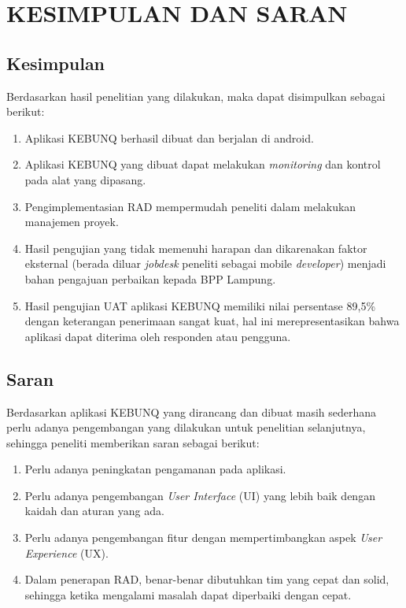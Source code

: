 \chapter{KESIMPULAN DAN SARAN}

%
\vspace{4.5pt}

\begin{flushleft}
    \begin{justify}
        \section{Kesimpulan}
        Berdasarkan hasil penelitian yang dilakukan, maka dapat disimpulkan sebagai berikut:
        \begin{enumerate}
            \item Aplikasi KEBUNQ berhasil dibuat dan berjalan di android.
            \item Aplikasi KEBUNQ yang dibuat dapat melakukan \emph{monitoring} dan kontrol pada alat yang dipasang.
            \item Pengimplementasian RAD mempermudah peneliti dalam melakukan manajemen proyek.
            \item Hasil pengujian yang tidak memenuhi harapan dan dikarenakan faktor eksternal (berada diluar \emph{jobdesk} peneliti sebagai mobile \emph{developer}) 
            menjadi bahan pengajuan perbaikan kepada BPP Lampung. 
            \item Hasil pengujian UAT aplikasi KEBUNQ memiliki nilai persentase 89,5\% dengan keterangan penerimaan sangat kuat, hal ini merepresentasikan bahwa aplikasi dapat diterima oleh responden atau pengguna.\\
        \end{enumerate}

        \section{Saran}
        Berdasarkan aplikasi KEBUNQ yang dirancang dan dibuat masih sederhana perlu adanya pengembangan yang dilakukan untuk penelitian selanjutnya, sehingga peneliti memberikan saran sebagai berikut:
        \begin{enumerate}
            \item Perlu adanya peningkatan pengamanan pada aplikasi.
            \item Perlu adanya pengembangan \emph{User Interface} (UI) yang lebih baik dengan kaidah dan aturan yang ada.
            \item Perlu adanya pengembangan fitur dengan mempertimbangkan aspek \emph{User Experience} (UX).
            \item Dalam penerapan RAD, benar-benar dibutuhkan tim yang cepat dan solid, sehingga ketika mengalami masalah dapat diperbaiki dengan cepat.
        \end{enumerate}

            
    \end{justify}
        
\end{flushleft}

\newpage